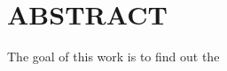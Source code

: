 \chapter*{ABSTRACT}
\def\ds{\displaystyle\mathstrut}
\def\baselinestretch{1.0}
\indent \indent The goal of this work is to find out the 



\setcounter{page}{1}
